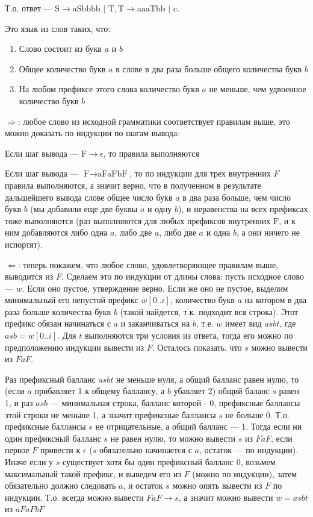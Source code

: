 \documentclass[12pt,a4paper]{scrartcl}
\begin{document}
\begin{description}
	Т.о. ответ --- $\text{S} \rightarrow \text{aSbbbb | T}, \text{T} \rightarrow \text{aaaTbb | c}$.
	
	
	\item[\fbox{3.}] Это язык из слов таких, что:
	
	\begin{enumerate}
		\item Слово состоит из букв $a$ и $b$
		\item Общее количество букв $a$ в слове в два раза больше общего количества букв $b$
		\item На любом префиксе этого слова количество букв $a$ не меньше, чем удвоенное количество букв $b$
	\end{enumerate}

	$\Rightarrow$: любое слово из исходной грамматики соответствует правилам выше, это можно доказать по индукции по шагам вывода:
	
	Если шаг вывода --- $\text{F} \rightarrow \epsilon$, то правила выполняются
	
	Если шаг вывода --- $\text{F} \rightarrow \text{aFaFbF}$, то по индукции для трех внутренних $F$ правила выполняются, а значит верно, что в полученном в результате дальшейшего вывода слове общее число букв $a$ в два раза больше, чем число букв $b$ (мы добавили еще две буквы $a$ и одну $b$), и неравенства на всех префиксах тоже выполняются (раз выполняются для любых префиксов внутренних $\text{F}$, и к ним добавляются либо одна $a$, либо две $a$, либо две $a$ и одна $b$, а они ничего не испортят).
	
	$\Leftarrow$: теперь покажем, что любое слово, удовлетворяющее правилам выше, выводится из $F$. Сделаем это по индукции от длины слова: пусть исходное слово --- $w$. Если оно пустое, утверждение верно. Если же оно не пустое, выделим минимальный его непустой префикс $w[0..i]$, количество букв $a$ на котором в два раза больше количества букв $b$ (такой найдется, т.к. подходит вся строка). Этот префикс обязан начинаться с $a$ и заканчиваться на $b$, т.е. $w$ имеет вид $asbt$, где $asb = w[0..i]$. Для $t$ выполняются три условия из ответа, тогда его можно по предположению индукции вывести из $F$. Осталось показать, что $s$ можно вывести из $FaF$.
	
	Раз префиксный балланс $asbt$ не меньше нуля, а общий балланс равен нулю, то (если $a$ прибавляет 1 к общему баллансу, а $b$ убавляет 2) общий баланс $s$ равен 1, и раз $asb$ --- минимальная строка, балланс которой - 0, префиксные баллансы этой строки не меньше 1, а значит префиксные баллансы $s$ не больше 0. Т.о. префиксные баллансы $s$ не отрицательные, а общий балланс --- 1. Тогда если ни один префиксный балланс $s$ не равен нулю, то можно вывести $s$ из $FaF$, если первое $F$ привести к $\epsilon$ ($s$ обязательно начинается с $a$, остаток --- по индукции). Иначе если у $s$ существует хотя бы один префиксный балланс 0, возьмем максимальный такой префикс, и выведем его из $F$ (можно по индукции), затем обязательно должно следовать $a$, и остаток $s$ можно опять вывести из $F$ по индукции. Т.о. всегда можно вывести $FaF \rightarrow s$, а значит можно вывести $w = asbt$ из $aFaFbF$
	

\end{description}
\end{document}
